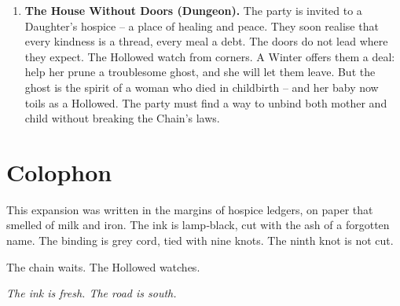 \documentclass[10pt,twoside]{book}
\begin{document}
\begin{enumerate}
\item \textbf{The House Without Doors (Dungeon).} The party is invited to a Daughter's hospice – a place of healing and peace. They soon realise that every kindness is a thread, every meal a debt. The doors do not lead where they expect. The Hollowed watch from corners. A Winter offers them a deal: help her prune a troublesome ghost, and she will let them leave. But the ghost is the spirit of a woman who died in childbirth – and her baby now toils as a Hollowed. The party must find a way to unbind both mother and child without breaking the Chain's laws.
\end{enumerate}

\chapter*{Colophon}
This expansion was written in the margins of hospice ledgers, on paper that smelled of milk and iron. The ink is lamp‑black, cut with the ash of a forgotten name. The binding is grey cord, tied with nine knots. The ninth knot is not cut.

The chain waits. The Hollowed watches.

\vspace{0.5cm}
\noindent
\textit{The ink is fresh. The road is south.}
\end{document}
